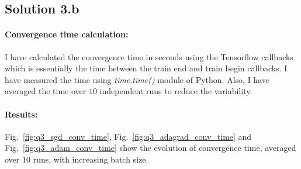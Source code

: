 \subsection*{Solution 3.b}
\paragraph{Convergence time calculation:} I have calculated the convergence time in seconds using the Tensorflow callbacks which is essentially the time between the train end and train begin callbacks. I have measured the time using \textit{time.time()} module of Python. Also, I have averaged the time over $10$ independent runs to reduce the variability.
\paragraph{Results:} Fig.~\ref{fig:q3_sgd_conv_time}, Fig.~\ref{fig:q3_adagrad_conv_time} and Fig.~\ref{fig:q3_adam_conv_time} show the evolution of convergence time, averaged over $10$ runs, with increasing batch size. 
